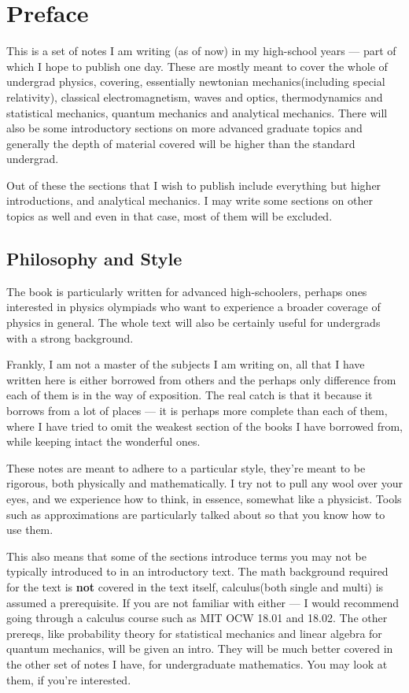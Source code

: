 \chapter{Preface}

This is a set of notes I am writing (as of now) in my high-school years --- part of which I hope to 
publish one day. These are mostly meant to cover the whole of undergrad physics, covering, essentially  
newtonian mechanics(including special relativity), classical electromagnetism, waves and optics, thermodynamics and statistical mechanics, 
quantum mechanics and analytical mechanics. There will also be some introductory sections on more advanced graduate 
topics and generally the depth of material covered will be higher than the standard undergrad. 

Out of these the sections that I wish to publish include everything but higher introductions, and analytical mechanics. 
I may write some sections on other topics as well and even in that case, most of them will be excluded.

\section{Philosophy and Style}

The book is particularly written for advanced high-schoolers, perhaps ones 
interested in physics olympiads who want to experience a broader coverage of physics in general.
The whole text will also be certainly useful for undergrads with a strong background. 

Frankly, I am not a master of the subjects I am writing on, all that I have written here is either 
borrowed from others and the perhaps only difference from each of them is in the way of exposition.
The real catch is that it because it borrows from a lot of places --- it is perhaps more complete 
than each of them, where I have tried to omit the weakest section of the books I have borrowed from,
while keeping intact the wonderful ones.

These notes are meant to adhere to a particular style, they're meant to be 
rigorous, both physically and mathematically. I try not to pull any wool over your eyes, and 
we experience how to think, in essence, somewhat like a physicist. Tools such as approximations 
are particularly talked about so that you know how to use them. 

This also means that some of the sections introduce terms you may not be typically introduced to in an introductory text.
The math background required for the text is \textbf{not} covered in the text itself, calculus(both single and multi) is assumed 
a prerequisite. If you are not familiar with either --- I would recommend going through a calculus course 
such as MIT OCW 18.01 and 18.02. The other prereqs, like probability theory for statistical mechanics 
and linear algebra for quantum mechanics, will be given an intro. They will be much better covered in 
the other set of notes I have, for undergraduate mathematics. You may look at them, if you're interested. 

